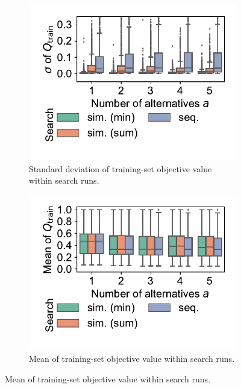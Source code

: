 \documentclass{article}
\theoremstyle{definition}
\begin{document}
\begin{figure}[p]
	\centering
	\begin{subfigure}[t]{0.48\textwidth}
		\centering
		\includegraphics[width=\textwidth, trim=15 25 15 10, clip]{plots/impact-search-stddev-train-objective.pdf}
		\caption{Standard deviation of training-set objective value within search runs.}
		\label{fig:afs:impact-search-stddev-train-objective}
	\end{subfigure}
	\hfill
	\begin{subfigure}[t]{0.48\textwidth}
		\centering
		\includegraphics[width=\textwidth, trim=15 25 15 10, clip]{plots/impact-search-mean-train-objective.pdf}
		\caption{Mean of training-set objective value within search runs.}

\end{subfigure}
\end{figure}
\end{document}
